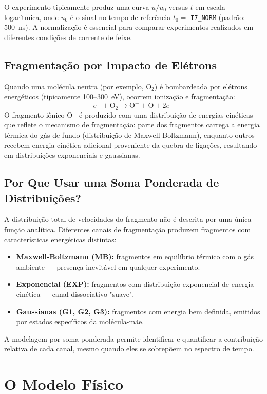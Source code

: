 \documentclass[12pt,a4paper]{report}
\begin{document}
O experimento tipicamente produz uma curva $u/u_0$ versus $t$ em escala
logarítmica, onde $u_0$ é o sinal no tempo de referência $t_0 =$ \texttt{I7\_NORM}
(padrão: 500~ns). A normalização é essencial para comparar experimentos
realizados em diferentes condições de corrente de feixe.

\subsection{Fragmentação por Impacto de Elétrons}

Quando uma molécula neutra (por exemplo, O$_2$) é bombardeada por elétrons
energéticos (tipicamente 100--300~eV), ocorrem ionização e fragmentação:
\[
  e^- + \text{O}_2 \longrightarrow \text{O}^+ + \text{O} + 2e^-
\]
O fragmento iônico O$^+$ é produzido com uma distribuição de energias
cinéticas que reflete o mecanismo de fragmentação: parte dos fragmentos
carrega a energia térmica do gás de fundo (distribuição de Maxwell-Boltzmann),
enquanto outros recebem energia cinética adicional proveniente da quebra de
ligações, resultando em distribuições exponenciais e gaussianas.

\subsection{Por Que Usar uma Soma Ponderada de Distribuições?}

A distribuição total de velocidades do fragmento não é descrita por uma
única função analítica. Diferentes canais de fragmentação produzem fragmentos
com características energéticas distintas:

\begin{itemize}[leftmargin=1.5em]
  \item \textbf{Maxwell-Boltzmann (MB):} fragmentos em equilíbrio térmico com
    o gás ambiente — presença inevitável em qualquer experimento.
  \item \textbf{Exponencial (EXP):} fragmentos com distribuição exponencial de
    energia cinética — canal dissociativo "suave".
  \item \textbf{Gaussianas (G1, G2, G3):} fragmentos com energia bem definida,
    emitidos por estados específicos da molécula-mãe.
\end{itemize}

A modelagem por soma ponderada permite identificar e quantificar a contribuição
relativa de cada canal, mesmo quando eles se sobrepõem no espectro de tempo.

\section{O Modelo Físico}
\end{document}
